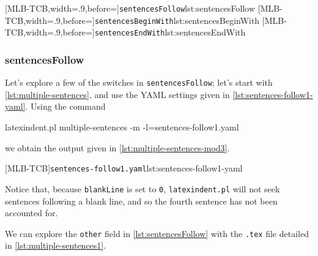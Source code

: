  \begin{cmhtcbraster}[raster columns=3,
   raster left skip=-3.5cm,
   raster right skip=-2cm,
   raster column skip=.06\linewidth]
  [MLB-TCB,width=.9\linewidth,before=\centering]{\texttt{sentencesFollow}}{lst:sentencesFollow}
  [MLB-TCB,width=.9\linewidth,before=\centering]{\texttt{sentencesBeginWith}}{lst:sentencesBeginWith}
  [MLB-TCB,width=.9\linewidth,before=\centering]{\texttt{sentencesEndWith}}{lst:sentencesEndWith}
 \end{cmhtcbraster}

\subsubsection{sentencesFollow}
 Let's explore a few of the switches in \texttt{sentencesFollow}; let's start with
 \vref{lst:multiple-sentences}, and use the YAML settings given in
 \cref{lst:sentences-follow1-yaml}. Using the command 
  
 \begin{commandshell}
latexindent.pl multiple-sentences -m -l=sentences-follow1.yaml
\end{commandshell}
 we obtain the output given in \cref{lst:multiple-sentences-mod3}.

 \begin{cmhtcbraster}
  [MLB-TCB]{\texttt{sentences-follow1.yaml}}{lst:sentences-follow1-yaml}
 \end{cmhtcbraster}

 Notice that, because \texttt{blankLine} is set to \texttt{0}, \texttt{latexindent.pl}
 will not seek sentences following a blank line, and so the fourth sentence has not been
 accounted for.

 We can explore the \texttt{other} field in \cref{lst:sentencesFollow} with the
 \texttt{.tex} file detailed in \cref{lst:multiple-sentences1}.


